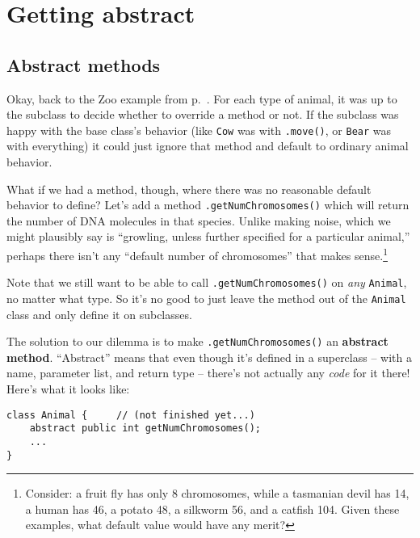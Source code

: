 \section{Getting abstract}

\subsection{Abstract methods}

Okay, back to the Zoo example from p.~\pageref{zooExample}. For each type of
animal, it was up to the subclass to decide whether to override a method or
not. If the subclass was happy with the base class's behavior (like
\texttt{Cow} was with \texttt{.move()}, or \texttt{Bear} was with everything)
it could just ignore that method and default to ordinary animal behavior.

What if we had a method, though, where there was no reasonable default
behavior to define? Let's add a method \texttt{.getNumChromosomes()} which
will return the number of DNA molecules in that species. Unlike making noise,
which we might plausibly say is ``growling, unless further specified for a
particular animal,'' perhaps there isn't any ``default number of chromosomes''
that makes sense.\footnote{Consider: a fruit fly has only 8 chromosomes, while
a tasmanian devil has 14, a human has 46, a potato 48, a silkworm 56, and a
catfish 104. Given these examples, what default value would have any merit?}

Note that we still want to be able to call \texttt{.getNumChromosomes()} on
\textit{any} \texttt{Animal}, no matter what type. So it's no good to just
leave the method out of the \texttt{Animal} class and only define it on
subclasses.

\begin{samepage}
The solution to our dilemma is to make \texttt{.getNumChromosomes()} an
\textbf{abstract method}. ``Abstract'' means that even though it's defined in a
superclass -- with a name, parameter list, and return type -- there's not
actually any \textit{code} for it there! Here's what it looks like:

\begin{Verbatim}[fontsize=\small,samepage=true,frame=single]
class Animal {     // (not finished yet...)
    abstract public int getNumChromosomes();
    ...
}
\end{Verbatim}
\end{samepage}

